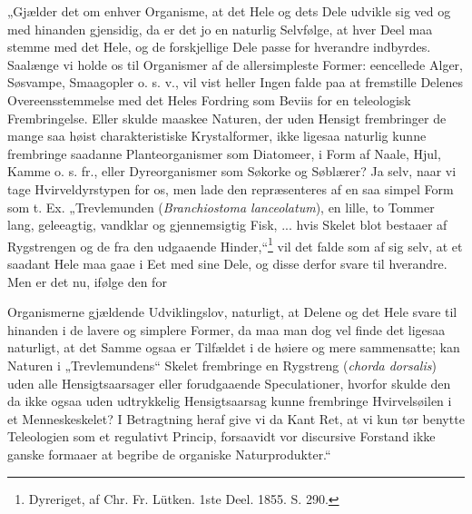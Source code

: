 \documentclass[12pt,a4paper]{book}
\begin{document}
„Gjælder det om enhver Organisme, at det Hele og dets Dele udvikle sig ved og
med hinanden gjensidig, da er det jo en naturlig Selvfølge, at hver Deel maa
stemme med det Hele, og de forskjellige Dele passe for hverandre indbyrdes.
Saalænge vi holde os til Organismer af de allersimpleste Former: eencellede
Alger, Søsvampe, Smaagopler o. s. v., vil vist heller Ingen falde paa at
fremstille Delenes Overeensstemmelse med det Heles Fordring som Beviis for en
teleologisk Frembringelse. Eller skulde maaskee Naturen, der uden Hensigt
frembringer de mange saa høist charakteristiske Krystalformer, ikke ligesaa
naturlig kunne frembringe saadanne Planteorganismer som Diatomeer, i Form af
Naale, Hjul, Kamme o. s. fr., eller Dyreorganismer som Søkorke og Søblærer? Ja
selv, naar vi tage Hvirveldyrstypen for os, men lade den repræsenteres af en
saa simpel Form som t. Ex. „Trevlemunden (\textit{Branchiostoma lanceolatum}),
en lille, to Tommer lang, geleeagtig, vandklar og gjennemsigtig Fisk, ... hvis
Skelet blot bestaaer af Rygstrengen og de fra den udgaaende
Hinder,“\footnote{Dyreriget, af Chr. Fr. Lütken. 1ste Deel. 1855. S. 290.} vil
det falde som af sig selv, at et saadant Hele maa gaae i Eet med sine Dele, og
disse derfor svare til hverandre. Men er det nu, ifølge den for

Organismerne gjældende Udviklingslov, naturligt, at Delene og det Hele svare
til hinanden i de lavere og simplere Former, da maa man dog vel finde det
ligesaa naturligt, at det Samme ogsaa er Tilfældet i de høiere og mere
sammensatte; kan Naturen i „Trevlemundens“ Skelet frembringe en Rygstreng
(\textit{chorda dorsalis}) uden alle Hensigtsaarsager eller forudgaaende
Speculationer, hvorfor skulde den da ikke ogsaa uden udtrykkelig
Hensigtsaarsag kunne frembringe Hvirvelsøilen i et Menneskeskelet? I
Betragtning heraf give vi da Kant Ret, at vi kun tør benytte Teleologien som et
regulativt Princip, forsaavidt vor discursive Forstand ikke ganske formaaer at
begribe de organiske Naturprodukter.“
\end{document}
